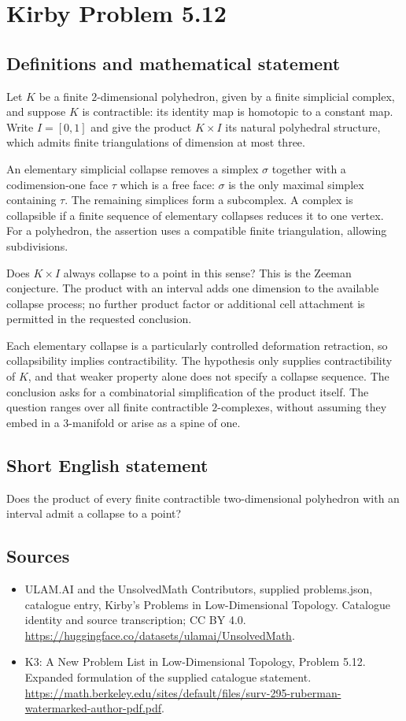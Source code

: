 \documentclass[11pt,a4paper]{article}
\begin{document}
\section*{Kirby Problem 5.12}\label{statement}

\subsection{Definitions and mathematical statement}
Let $K$ be a finite $2$-dimensional polyhedron, given by a
finite simplicial complex, and suppose $K$ is contractible:
its identity map is homotopic to a constant map. Write
$I=[0,1]$ and give the product $K\times I$ its natural
polyhedral structure, which admits finite triangulations of
dimension at most three.

An elementary simplicial collapse removes a simplex $\sigma$
together with a codimension-one face $\tau$ which is a free
face: $\sigma$ is the only maximal simplex containing
$\tau$. The remaining simplices form a subcomplex. A complex
is collapsible if a finite sequence of elementary collapses
reduces it to one vertex. For a polyhedron, the assertion
uses a compatible finite triangulation, allowing subdivisions.

Does $K\times I$ always collapse to a point in this sense?
This is the Zeeman conjecture. The product with an interval
adds one dimension to the available collapse process; no
further product factor or additional cell attachment is
permitted in the requested conclusion.

Each elementary collapse is a particularly controlled deformation
retraction, so collapsibility implies contractibility. The hypothesis
only supplies contractibility of $K$, and that weaker property
alone does not specify a collapse sequence. The conclusion
asks for a combinatorial simplification of the product itself.
The question ranges over all finite contractible $2$-complexes,
without assuming they embed in a $3$-manifold or arise as a
spine of one.
\subsection{Short English statement}
Does the product of every finite contractible two-dimensional polyhedron with an interval admit a collapse to a point?
\subsection{Sources}
\begin{itemize}
\item[S1] ULAM.AI and the UnsolvedMath Contributors, supplied problems.json, catalogue entry, Kirby's Problems in Low-Dimensional Topology. Catalogue identity and source transcription; CC BY 4.0.
\url{https://huggingface.co/datasets/ulamai/UnsolvedMath}.
\item[S2] K3: A New Problem List in Low-Dimensional Topology, Problem 5.12. Expanded formulation of the supplied catalogue statement.
\url{https://math.berkeley.edu/sites/default/files/surv-295-ruberman-watermarked-author-pdf.pdf}.
\end{itemize}
\end{document}

